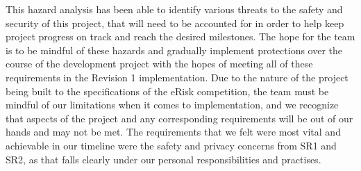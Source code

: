 \documentclass{article}
\begin{document}
This hazard analysis has been able to identify various threats to the safety and security of this project, that will need to be accounted for in order to help keep project progress on track and reach the desired milestones. The hope for the team is to be mindful of these hazards and gradually implement protections over the course of the development project with the hopes of meeting all of these requirements in the Revision 1 implementation. Due to the nature of the project being built to the specifications of the eRisk competition, the team must be mindful of our limitations when it comes to implementation, and we recognize that aspects of the project and any corresponding requirements will be out of our hands and may not be met. The requirements that we felt were most vital and achievable in our timeline were the safety and privacy concerns from SR1 and SR2, as that falls clearly under our personal responsibilities and practises.
\end{document}
